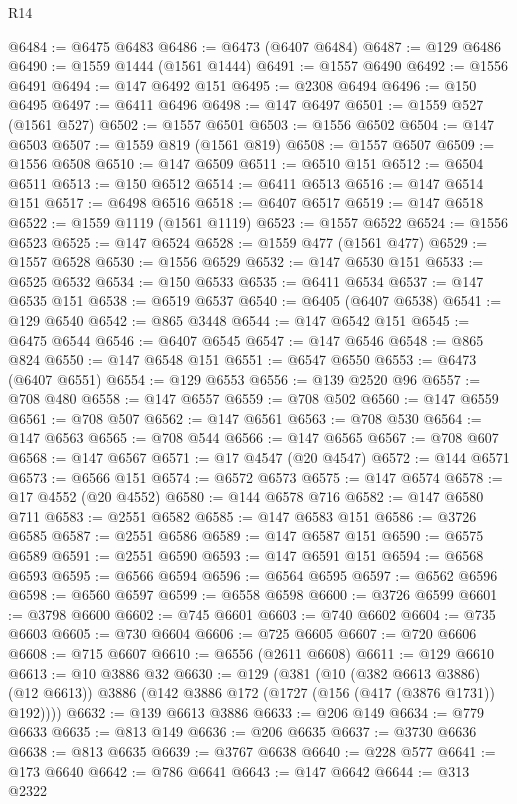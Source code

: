\begin{lexlean}{R14}
\begin{coremodule}
@6484 := @6475 @6483
@6486 := @6473 (@6407 @6484)
@6487 := @129 @6486
@6490 := @1559 @1444 (@1561 @1444)
@6491 := @1557 @6490
@6492 := @1556 @6491
@6494 := @147 @6492 @151
@6495 := @2308 @6494
@6496 := @150 @6495
@6497 := @6411 @6496
@6498 := @147 @6497
@6501 := @1559 @527 (@1561 @527)
@6502 := @1557 @6501
@6503 := @1556 @6502
@6504 := @147 @6503
@6507 := @1559 @819 (@1561 @819)
@6508 := @1557 @6507
@6509 := @1556 @6508
@6510 := @147 @6509
@6511 := @6510 @151
@6512 := @6504 @6511
@6513 := @150 @6512
@6514 := @6411 @6513
@6516 := @147 @6514 @151
@6517 := @6498 @6516
@6518 := @6407 @6517
@6519 := @147 @6518
@6522 := @1559 @1119 (@1561 @1119)
@6523 := @1557 @6522
@6524 := @1556 @6523
@6525 := @147 @6524
@6528 := @1559 @477 (@1561 @477)
@6529 := @1557 @6528
@6530 := @1556 @6529
@6532 := @147 @6530 @151
@6533 := @6525 @6532
@6534 := @150 @6533
@6535 := @6411 @6534
@6537 := @147 @6535 @151
@6538 := @6519 @6537
@6540 := @6405 (@6407 @6538)
@6541 := @129 @6540
@6542 := @865 @3448
@6544 := @147 @6542 @151
@6545 := @6475 @6544
@6546 := @6407 @6545
@6547 := @147 @6546
@6548 := @865 @824
@6550 := @147 @6548 @151
@6551 := @6547 @6550
@6553 := @6473 (@6407 @6551)
@6554 := @129 @6553
@6556 := @139 @2520 @96
@6557 := @708 @480
@6558 := @147 @6557
@6559 := @708 @502
@6560 := @147 @6559
@6561 := @708 @507
@6562 := @147 @6561
@6563 := @708 @530
@6564 := @147 @6563
@6565 := @708 @544
@6566 := @147 @6565
@6567 := @708 @607
@6568 := @147 @6567
@6571 := @17 @4547 (@20 @4547)
@6572 := @144 @6571
@6573 := @6566 @151
@6574 := @6572 @6573
@6575 := @147 @6574
@6578 := @17 @4552 (@20 @4552)
@6580 := @144 @6578 @716
@6582 := @147 @6580 @711
@6583 := @2551 @6582
@6585 := @147 @6583 @151
@6586 := @3726 @6585
@6587 := @2551 @6586
@6589 := @147 @6587 @151
@6590 := @6575 @6589
@6591 := @2551 @6590
@6593 := @147 @6591 @151
@6594 := @6568 @6593
@6595 := @6566 @6594
@6596 := @6564 @6595
@6597 := @6562 @6596
@6598 := @6560 @6597
@6599 := @6558 @6598
@6600 := @3726 @6599
@6601 := @3798 @6600
@6602 := @745 @6601
@6603 := @740 @6602
@6604 := @735 @6603
@6605 := @730 @6604
@6606 := @725 @6605
@6607 := @720 @6606
@6608 := @715 @6607
@6610 := @6556 (@2611 @6608)
@6611 := @129 @6610
@6613 := @10 @3886 @32
@6630 := @129
    (@381
      (@10 (@382 @6613 @3886) (@12 @6613))
      @3886
      (@142 @3886 @172 (@1727 (@156 (@417 (@3876 @1731)) @192))))
@6632 := @139 @6613 @3886
@6633 := @206 @149
@6634 := @779 @6633
@6635 := @813 @149
@6636 := @206 @6635
@6637 := @3730 @6636
@6638 := @813 @6635
@6639 := @3767 @6638
@6640 := @228 @577
@6641 := @173 @6640
@6642 := @786 @6641
@6643 := @147 @6642
@6644 := @313 @2322

\end{coremodule}
\end{lexlean}
